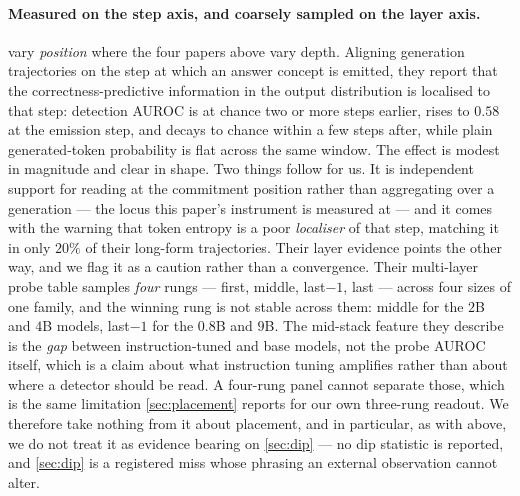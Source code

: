 \documentclass[10pt, letterpaper]{article}
\begin{document}
\paragraph{Measured on the step axis, and coarsely sampled on the layer axis.}
\citet{yeom2026commitment} vary \emph{position} where the four papers above vary depth. Aligning
generation trajectories on the step at which an answer concept is emitted, they report that the
correctness-predictive information in the output distribution is localised to that step: detection
AUROC is at chance two or more steps earlier, rises to $0.58$ at the emission step, and decays to
chance within a few steps after, while plain generated-token probability is flat across the same
window. The effect is modest in magnitude and clear in shape. Two things follow for us. It is
independent support for reading at the commitment position rather than aggregating over a
generation --- the locus this paper's instrument is measured at --- and it comes with the warning
that token entropy is a poor \emph{localiser} of that step, matching it in only $20\%$ of their
long-form trajectories. Their layer evidence points the other way, and we flag it as a caution
rather than a convergence. Their multi-layer probe table samples \emph{four} rungs --- first, middle,
last$-1$, last --- across four sizes of one family, and the winning rung is not stable across them:
middle for the $2$B and $4$B models, last$-1$ for the $0.8$B and $9$B. The mid-stack feature they
describe is the \emph{gap} between instruction-tuned and base models, not the probe AUROC itself,
which is a claim about what instruction tuning amplifies rather than about where a detector should
be read. A four-rung panel cannot separate those, which is the same limitation \cref{sec:placement}
reports for our own three-rung readout. We therefore take nothing from it about placement, and in
particular, as with \citet{kossen2024sep} above, we do not treat it as evidence bearing on
\cref{sec:dip} --- no dip statistic is reported, and \cref{sec:dip} is a registered miss whose
phrasing an external observation cannot alter.
\end{document}
